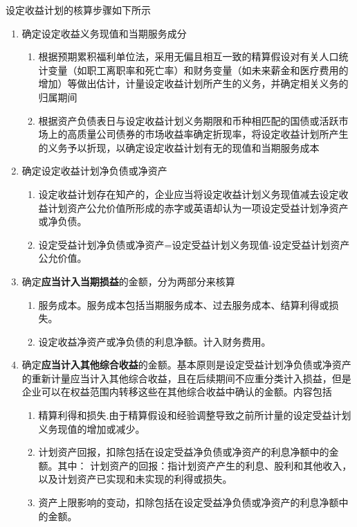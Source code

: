 \documentclass[UTF8,12pt]{ctexart}
\numberwithin{equation}{section} %
\numberwithin{figure}{section}
\numberwithin{table}{section}
\begin{document}
	设定收益计划的核算步骤如下所示
	\begin{enumerate}
		\item 确定设定收益义务现值和当期服务成分
		\begin{enumerate}
			\item 根据预期累积福利单位法，采用无偏且相互一致的精算假设对有关人口统计变量（如职工离职率和死亡率）和财务变量（如未来薪金和医疗费用的增加）等做出估计，计量设定收益计划所产生的义务，并确定相关义务的归属期间
			
			\item 根据资产负债表日与设定收益计划义务期限和币种相匹配的国债或活跃市场上的高质量公司债券的市场收益率确定折现率，将设定收益计划所产生的义务予以折现，以确定设定收益计划有无的现值和当期服务成本
		\end{enumerate}
		
		\item 确定设定收益计划净负债或净资产
		\begin{enumerate}
			\item 设定收益计划存在知产的，企业应当将设定收益计划义务现值减去设定收益计划资产公允价值所形成的赤字或英语却认为一项设定受益计划净资产或净负债。
			
			\item 设定受益计划净负债或净资产=设定受益计划义务现值-设定受益计划资产公允价值。
		\end{enumerate}
		
		\item 确定\textbf{应当计入当期损益}的金额，分为两部分来核算
		\begin{enumerate}
			\item 服务成本。服务成本包括当期服务成本、过去服务成本、结算利得或损失。
			
			\item 设定收益净资产或净负债的利息净额。计入财务费用。
		\end{enumerate}
		
		\item 确定\textbf{应当计入其他综合收益}的金额。基本原则是设定受益计划净负债或净资产的重新计量应当计入其他综合收益，且在后续期间不应重分类计入损益，但是企业可以在权益范围内转移这些在其他综合收益中确认的金额。内容包括
		\begin{enumerate}
			\item 精算利得和损失.由于精算假设和经验调整导致之前所计量的设定受益计划义务现值的增加或减少。
			
			\item 计划资产回报，扣除包括在设定受益净负债或净资产的利息净额中的金额。其中：
			计划资产的回报：指计划资产产生的利息、股利和其他收入，以及计划资产已实现和未实现的利得或损失。
			
			\item 资产上限影响的变动，扣除包括在设定受益净负债或净资产的利息净额中的金额。
		\end{enumerate}
	\end{enumerate}
\end{document}
